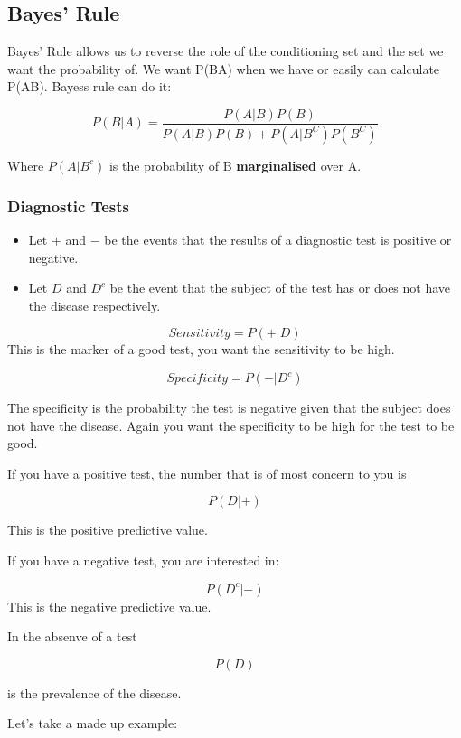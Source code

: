 \documentclass[]{article}
\providecommand{\tightlist}{%
  \setlength{\itemsep}{0pt}\setlength{\parskip}{0pt}}
\begin{document}
\hypertarget{bayes-rule}{%
\subsection{Bayes' Rule}\label{bayes-rule}}

Bayes' Rule allows us to reverse the role of the conditioning set and
the set we want the probability of. We want P(B\textbar{}A) when we have
or easily can calculate P(A\textbar{}B). Bayess rule can do it:

\[ P(B|A) = \frac{
    P(A|B)P(B)
}{
    P(A|B)P(B) + P(A|B^C)P(B^C)
}\]

Where \(P(A|B^c)\) is the probability of B \textbf{marginalised} over A.

\hypertarget{diagnostic-tests}{%
\subsubsection{Diagnostic Tests}\label{diagnostic-tests}}

\begin{itemize}
\tightlist
\item
  Let \(+\) and \(-\) be the events that the results of a diagnostic
  test is positive or negative.
\item
  Let \(D\) and \(D^c\) be the event that the subject of the test has or
  does not have the disease respectively.
\end{itemize}

\[ Sensitivity = P(+ | D) \] This is the marker of a good test, you want
the sensitivity to be high.

\[ Specificity = P(-|D^c) \]

The specificity is the probability the test is negative given that the
subject does not have the disease. Again you want the specificity to be
high for the test to be good.

If you have a positive test, the number that is of most concern to you
is

\[ P(D|+) \]

This is the positive predictive value.

If you have a negative test, you are interested in:

\[ P(D^c|-) \] This is the negative predictive value.

In the absenve of a test

\[ P(D) \]

is the prevalence of the disease.

Let's take a made up example:
\end{document}
